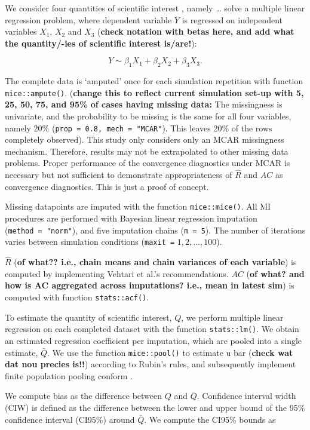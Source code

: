 \documentclass[Royal,times,sageh]{sagej}
\begin{document}
We consider four quantities of scientific interest \citep[`conceptual
estimands';][]{morr19}, namely \ldots{} solve a multiple linear
regression problem, where dependent variable \(Y\) is regressed on
independent variables \(X_1\), \(X_2\) and \(X_3\) (\textbf{check
notation with betas here, and add what the quantity/-ies of scientific
interest is/are!}):

\[Y \sim \beta_1 X_1 + \beta_2 X_2 + \beta_3 X_3.\]

The complete data is `amputed' once for each simulation repetition with
function \texttt{mice::ampute()}. (\textbf{change this to reflect
current simulation set-up with 5, 25, 50, 75, and 95\% of cases having
missing data:} The missingness is univariate, and the probability to be
missing is the same for all four variables, namely 20\%
(\texttt{prop\ =\ 0.8,\ mech\ =\ "MCAR"}). This leaves 20\% of the rows
completely observed). This study only considers only an MCAR missingness
mechanism. Therefore, results may not be extrapolated to other missing
data problems. Proper performance of the convergence diagnostics under
MCAR is necessary but not sufficient to demonstrate appropriateness of
\(\widehat{R}\) and \(AC\) as convergence diagnostics. This is just a
proof of concept.

Missing datapoints are imputed with the function \texttt{mice::mice()}.
All MI procedures are performed with Bayesian linear regression
imputation (\texttt{method\ =\ "norm"}), and five imputation chains
(\texttt{m\ =\ 5}). The number of iterations varies between simulation
conditions (\texttt{maxit\ =} \(1, 2, \dots, 100\)).

\(\widehat{R}\) (\textbf{of what?? i.e., chain means and chain variances
of each variable}) is computed by implementing Vehtari et al.'s
\citeyearpar{veht19} recommendations. \(AC\) (\textbf{of what? and how
is AC aggregated across imputations? i.e., mean in latest sim}) is
computed with function \texttt{stats::acf()}.

To estimate the quantity of scientific interest, \(Q\), we perform
multiple linear regression on each completed dataset with the function
\texttt{stats::lm()}. We obtain an estimated regression coefficient per
imputation, which are pooled into a single estimate, \(\bar{Q}\). We use
the function \texttt{mice::pool()} to estimate u bar (\textbf{check wat
dat nou precies is!!}) according to Rubin's \citeyearpar{rubin87} rules,
and subsequently implement finite population pooling conform
\citet{vink14}.

We compute bias as the difference between \(Q\) and \(\bar{Q}\).
Confidence interval width (CIW) is defined as the difference between the
lower and upper bound of the 95\% confidence interval (CI95\%) around
\(\bar{Q}\). We compute the CI95\% bounds as
\end{document}
